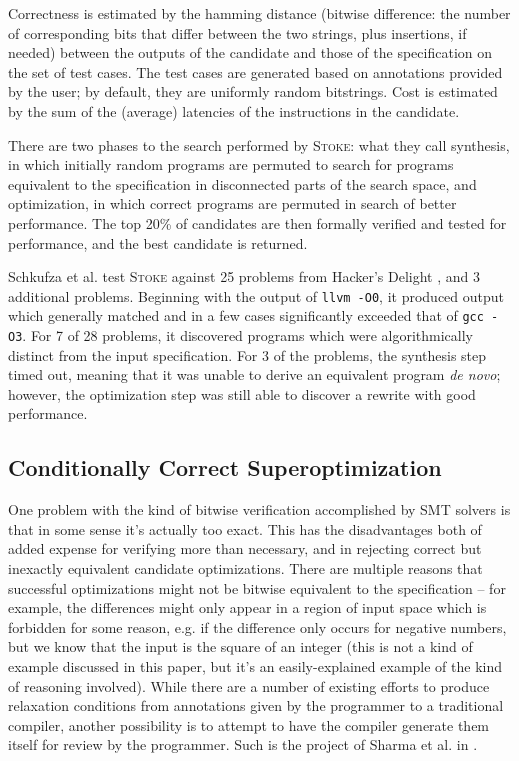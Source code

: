 \documentclass[12pt,twoside]{reedthesis}
\begin{document}
        Correctness is estimated by the hamming distance (bitwise difference: the number of corresponding bits that differ between the two strings, plus insertions, if needed) between the outputs of the candidate and those of the specification on the set of test cases.
        The test cases are generated based on annotations provided by the user; by default, they are uniformly random bitstrings.
        Cost is estimated by the sum of the (average) latencies of the instructions in the candidate.
        
        There are two phases to the search performed by \textsc{Stoke}:
            what they call synthesis, in which initially random programs are permuted to search for programs equivalent to the specification in disconnected parts of the search space,
            and optimization, in which correct programs are permuted in search of better performance.
        The top 20\% of candidates are then formally verified and tested for performance, and the best candidate is returned.
        
        Schkufza et al. test \textsc{Stoke} against 25 problems from Hacker's Delight \cite{warren2013hackers}, and 3 additional problems. 
        Beginning with the output of \texttt{llvm -O0}, it produced output which generally matched and in a few cases significantly exceeded that of \texttt{gcc -O3}.
        For 7 of 28 problems, it discovered programs which were algorithmically distinct from the input specification.
        For 3 of the problems, the synthesis step timed out, meaning that it was unable to derive an equivalent program \textit{de novo}; however, the optimization step was still able to discover a rewrite with good performance.

    \subsection{Conditionally Correct Superoptimization}
        One problem with the kind of bitwise verification accomplished by SMT solvers is that in some sense it's actually too exact.
        This has the disadvantages both of added expense for verifying more than necessary, and in rejecting correct but inexactly equivalent candidate optimizations.
        There are multiple reasons that successful optimizations might not be bitwise equivalent to the specification
            -- for example, the differences might only appear in a region of input space which is forbidden for some reason,
                e.g. if the difference only occurs for negative numbers, but we know that the input is the square of an integer
               (this is not a kind of example discussed in this paper, but it's an easily-explained example of the kind of reasoning involved).
        While there are a number of existing efforts to produce relaxation conditions from annotations given by the programmer to a traditional compiler, another possibility is to attempt to have the compiler generate them itself for review by the programmer.
        Such is the project of Sharma et al. in \cite{sharma2015conditionally}.
        
\end{document}
